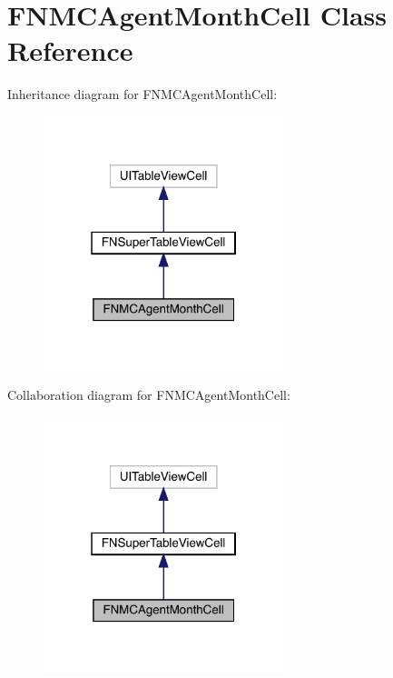 \hypertarget{interface_f_n_m_c_agent_month_cell}{}\section{F\+N\+M\+C\+Agent\+Month\+Cell Class Reference}
\label{interface_f_n_m_c_agent_month_cell}


Inheritance diagram for F\+N\+M\+C\+Agent\+Month\+Cell\+:\nopagebreak
\begin{figure}[H]
\begin{center}
\leavevmode
\includegraphics[width=199pt]{interface_f_n_m_c_agent_month_cell__inherit__graph}
\end{center}
\end{figure}


Collaboration diagram for F\+N\+M\+C\+Agent\+Month\+Cell\+:\nopagebreak
\begin{figure}[H]
\begin{center}
\leavevmode
\includegraphics[width=199pt]{interface_f_n_m_c_agent_month_cell__coll__graph}
\end{center}
\end{figure}

